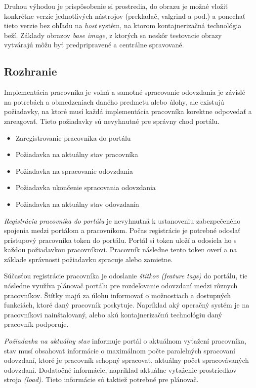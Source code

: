 \documentclass[
  digital, %
  twoside, %
  table,   %
  lof,     %
  lot,     %
]{fithesis3}
\begin{document}
Druhou výhodou je prispôsobenie si prostredia, do obrazu je možné vložiť konkrétne verzie jednotlivých nástrojov (prekladač, valgrind a pod.) a ponechať tieto verzie bez ohľadu na \emph{host} systém, na ktorom kontajnerizačná technológia beží. Základy obrazov \emph{base image}, z ktorých sa neskôr testovacie obrazy vytvárajú môžu byť predpripravené a centrálne spravované.


\subsection{Rozhranie}

Implementácia pracovníka je voľná a samotné spracovanie odovzdania je závislé na potrebách a obmedzeniach daného predmetu alebo úlohy, ale existujú požiadavky, na ktoré musí každá implementácia pracovníka korektne odpovedať a zareagovať. Tieto požiadavky sú nevyhnutné pre správny chod portálu.

\begin{itemize}
    \item Zaregistrovanie pracovníka do portálu
    \item Požiadavka na aktuálny stav pracovníka
    \item Požiadavka na spracovanie odovzdania
    \item Požiadavka ukončenie spracovania odovzdania
    \item Požiadavka na aktuálny stav odovzdania
\end{itemize}

\emph{Registrácia pracovníka do portálu} je nevyhnutná k ustanoveniu zabezpečeného spojenia medzi portálom a pracovníkom. Počas registrácie je potrebné odoslať prístupový pracovníka token do portálu. Portál si token uloží a odosiela ho s každou požiadavkou pracovníkovi. Pracovník následne tento token overí a na základe správnosti požiadavku spracuje alebo zamietne.

Súčasťou registrácie pracovníka je odoslanie \emph{štítkov (feature tags)} do portálu, tie následne využíva plánovač portálu pre rozdeľovanie odovzdaní medzi rôznych pracovníkov. Štítky majú za úlohu informovať o možnostiach a dostupných funkciách, ktoré daný pracovník poskytuje. Napríklad aký operačný systém je na pracovníkovi nainštalovaný, alebo akú kontajnerizačnú technológiu daný pracovník podporuje.

\emph{Požiadavka na aktuálny stav} informuje portál o aktuálnom vyťažení pracovníka, stav musí obsahovať informácie o maximálnom počte paralelných spracovaní odovzdaní, ktoré je pracovník schopný spracovať, aktuálny počet spracovávaných odovzdaní. Dodatočné informácie, napríklad aktuálne vyťaženie prostriedkov stroja \emph{(load)}. Tieto informácie sú taktiež potrebné pre plánovač.
\end{document}

